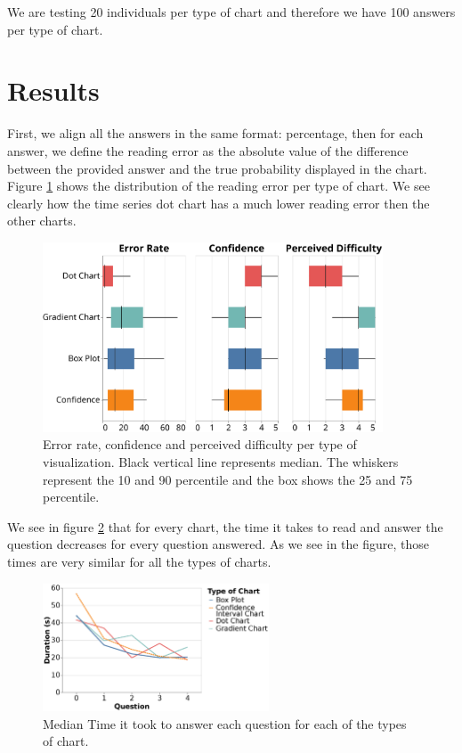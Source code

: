 \documentclass[a4paper,3p,sort&compress]{elsarticle}
\begin{document}
We are testing 20 individuals per type of chart and therefore we have 100 answers per 
type of chart.

\section{Results}
\label{sec:results}

First, we align all the answers in the same format: percentage, then for each answer, we define the 
reading error as the absolute value of the difference 
between the provided answer and the true probability displayed in the chart. Figure \ref{figure:errors} shows 
the distribution of the reading error per type of chart. We see clearly how the time series dot chart
has a much lower reading error then the other charts. 

\begin{figure}
  \centering
  \includegraphics[width=0.9\textwidth]{comparison}
  \caption{\label{figure:errors}Error rate, confidence and perceived difficulty per 
  type of visualization. Black vertical line represents median.
  The whiskers represent the 10 and 90 percentile and the box shows the 25 and 
  75 percentile.}
\end{figure}

We see in figure \ref{figure:duration} that for every chart, the time it takes 
to read and answer the question decreases for every question answered. As we see in the figure, those times 
are very similar for all the types of charts. 

\begin{figure}
  \centering
   \includegraphics[width=0.6\textwidth]{duration_evo2}
  \caption{\label{figure:duration} Median Time it took to answer each question for each of the types of chart.}
\end{figure}  
\end{document}
